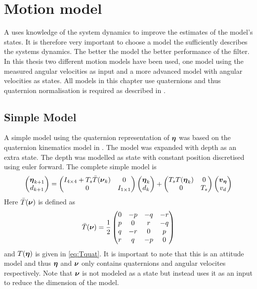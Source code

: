 \section{Motion model}
A \abbrKF uses knowledge of the system dynamics to improve the estimates of the model's states. It is therefore very important to choose a model the sufficiently describes the systems dynamics. The better the model the better performance of the filter. In this thesis two different motion models have been used, one model using the measured angular velocities as input and a more advanced model with angular velocities as states. All models in this chapter use quaternions and thus quaternion normalisation is required as described in .

\subsection{Simple Model}\label{sec:simple_model}
A simple model using the quaternion representation of $\boldsymbol{\eta}$ was based on the quaternion kinematics model in \citet[p.47]{Tornqvist}. The model was expanded with depth as an extra state. The depth was modelled as state with constant position discretised using euler forward. The complete simple model is 
\begin{equation}
\begin{pmatrix}
\boldsymbol{\eta}_{k+1}\\
d_{k+1}
\end{pmatrix} 
=
 \begin{pmatrix}
 I_{4\times4} + T_s \bar{T}(\boldsymbol{\nu}_k) & 0\\
 0 & I_{1\times1} 
 \end{pmatrix}
 \begin{pmatrix}
 \boldsymbol{\eta}_{k}\\
 d_k
 \end{pmatrix}
 +
  \begin{pmatrix}
  T_s T(\boldsymbol{\eta}_{k}) & 0\\
  0 & T_s
  \end{pmatrix}
  \begin{pmatrix}
  \boldsymbol{v}_{\boldsymbol{\eta}}\\
  v_d 
  \end{pmatrix}
\end{equation}
Here $\bar{T}(\boldsymbol{\nu})$ is defined as
\begin{equation}
\bar{T}(\boldsymbol{\nu}) = \frac{1}{2}
\begin{pmatrix}
     0 &-p &-q &-r\\
     p & 0 & r &-q\\
     q &-r & 0 & p\\
     r & q &-p & 0
\end{pmatrix}
\end{equation} and $T(\boldsymbol{\eta})$ is given in \eqref{eq:Tquat}.
It is important to note that this is an attitude model and thus $\boldsymbol{\eta}$ and $\boldsymbol{\nu}$ only contains quaternions and angular velocites respectively. Note that $\boldsymbol{\nu}$ is not modeled as a state but \citet{Tornqvist} instead uses it as an input to reduce the dimension of the model. 
